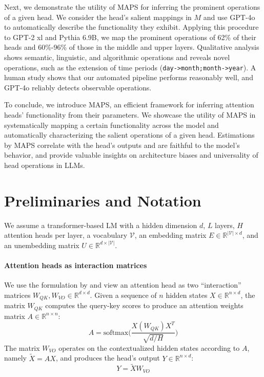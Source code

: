 \documentclass[11pt]{article}
\newcommand{\PythiaSevenB}{Pythia 6.9B}
\newcommand{\GPTxl}{GPT-2 xl}
\newcommand{\GPTFourO}{GPT-4o}
\newcommand{\framework}{\textsc{MAPS}}
\begin{document}
Next, we demonstrate the utility of \framework{} for inferring the prominent operations of a given head. We consider the head's salient mappings in $M$ and use {\GPTFourO} \cite{hurst2024gpt} to automatically describe the functionality they exhibit. Applying this procedure to {\GPTxl} and {\PythiaSevenB}, we map the prominent operations of 62\% of their heads
and 60\%-96\% of those in the middle and upper layers. Qualitative analysis shows semantic, linguistic, and algorithmic operations and reveals novel operations, such as the extension of time periods (\texttt{day->month;month->year}). 
A human study shows that our automated pipeline performs reasonably well, and {\GPTFourO} reliably detects observable operations.

To conclude, we introduce \framework{}, an efficient framework for inferring attention heads' functionality from their parameters. We showcase the utility of \framework{} in systematically mapping a certain functionality across the model and automatically characterizing the salient operations of a given head. Estimations by \framework{} correlate with the head's outputs and are faithful to the model's behavior, and provide valuable insights on architecture biases and universality of head operations in LLMs.



\section{Preliminaries and Notation}
\label{sec:preliminaries}

We assume a transformer-based LM with a hidden dimension $d$, $L$ layers, $H$ attention heads per layer, a vocabulary $\mathcal{V}$, an embedding matrix $E \in \mathbb{R}^{|\mathcal{V}| \times d}$, and an unembedding matrix $U \in \mathbb{R}^{d \times |\mathcal{V}|}$.

\paragraph{Attention heads as interaction matrices}
We use the formulation by \citet{elhage2021mathematical} and view an attention head as two ``interaction'' matrices $W_{QK},W_{VO}\in\mathbb{R}^{d \times d}$.
Given a sequence of $n$ hidden states $X \in \mathbb{R}^{n\times d}$, the matrix $W_{QK}$ computes the query-key scores to produce an attention weights matrix $A \in \mathbb{R}^{n \times n}$:
\begin{equation*}
A = \text{softmax}\Bigg(\frac{X (W_{QK}) X^T}{\sqrt{d / H}}\Bigg)
\end{equation*}
The matrix $W_{VO}$ operates on the contextualized hidden states according to $A$, namely $\tilde{X} = AX$, and produces the head's output $Y \in \mathbb{R}^{n\times d}$:
\begin{equation}
\label{eq:heads_transformation}
    Y = \tilde{X} W_{VO}
\end{equation}
\end{document}
